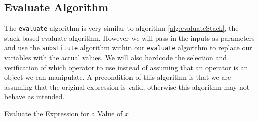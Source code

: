 \documentclass[../../../../../main.tex]{subfiles}
\begin{document}
\subsection{Evaluate Algorithm}	
The \texttt{evaluate} algorithm is very similar to algorithm \ref{alg:evaluateStack}, the stack-based evaluate algorithm. However we will pass in the inputs as parameters and use the \texttt{substitute} algorithm within our \texttt{evaluate} algorithm to replace our variables with the actual values. We will also hardcode the selection and verification of which operator to use instead of assuming that an operator is an object we can manipulate. A precondition of this algorithm is that we are assuming that the original expression is valid, otherwise this algorithm may not behave as intended.

\begin{algorithm}[H]
\DontPrintSemicolon
\caption{Evaluate the Expression for a Value of $x$}
\end{algorithm}
\newpage
\end{document}
